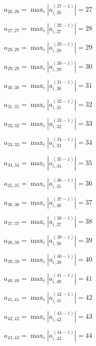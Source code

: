 \documentclass[a4paper,12pt]{article}
\begin{document}
$a _{ 26, 26 } =  \max _i |a _{ i, 26 } ^{ (27 - 1) } | = 27$

$a _{ 27, 27 } =  \max _i |a _{ i, 27 } ^{ (28 - 1) } | = 28$

$a _{ 28, 28 } =  \max _i |a _{ i, 28 } ^{ (29 - 1) } | = 29$

$a _{ 29, 29 } =  \max _i |a _{ i, 29 } ^{ (30 - 1) } | = 30$

$a _{ 30, 30 } =  \max _i |a _{ i, 30 } ^{ (31 - 1) } | = 31$

$a _{ 31, 31 } =  \max _i |a _{ i, 31 } ^{ (32 - 1) } | = 32$

$a _{ 32, 32 } =  \max _i |a _{ i, 32 } ^{ (33 - 1) } | = 33$

$a _{ 33, 33 } =  \max _i |a _{ i, 33 } ^{ (34 - 1) } | = 34$

$a _{ 34, 34 } =  \max _i |a _{ i, 34 } ^{ (35 - 1) } | = 35$

$a _{ 35, 35 } =  \max _i |a _{ i, 35 } ^{ (36 - 1) } | = 36$

$a _{ 36, 36 } =  \max _i |a _{ i, 36 } ^{ (37 - 1) } | = 37$

$a _{ 37, 37 } =  \max _i |a _{ i, 37 } ^{ (38 - 1) } | = 38$

$a _{ 38, 38 } =  \max _i |a _{ i, 38 } ^{ (39 - 1) } | = 39$

$a _{ 39, 39 } =  \max _i |a _{ i, 39 } ^{ (40 - 1) } | = 40$

$a _{ 40, 40 } =  \max _i |a _{ i, 40 } ^{ (41 - 1) } | = 41$

$a _{ 41, 41 } =  \max _i |a _{ i, 41 } ^{ (42 - 1) } | = 42$

$a _{ 42, 42 } =  \max _i |a _{ i, 42 } ^{ (43 - 1) } | = 43$

$a _{ 43, 43 } =  \max _i |a _{ i, 43 } ^{ (44 - 1) } | = 44$
\end{document}
